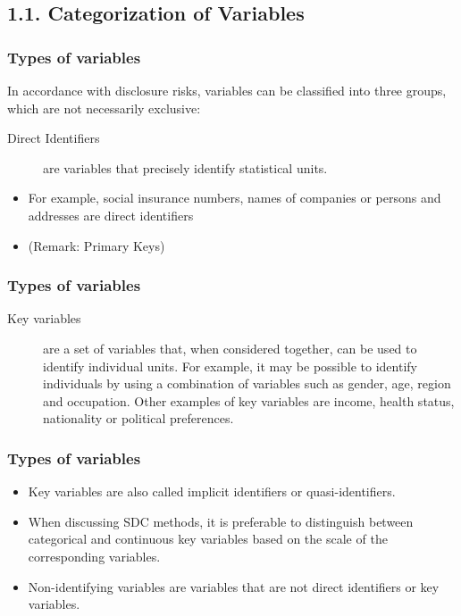 \documentclass{beamer}
\begin{document}
\subsection*{1.1. Categorization of Variables}
\begin{frame}
\frametitle{Types of variables}

In accordance with disclosure risks, variables can be classiﬁed into three groups,
which are not necessarily exclusive:

\bigskip
\begin{description}
	\item[Direct Identifiers] are variables that precisely identify statistical units. 
\end{description}

\begin{itemize}
	\item For example, social insurance numbers, names of companies or persons and addresses
	are direct identiﬁers 
	\item (Remark: Primary Keys)
\end{itemize}
\end{frame}
\begin{frame}
\frametitle{Types of variables}
\begin{description}
	\item[Key variables] are a set of variables that, when considered together, can be used
	to identify individual units. For example, it may be possible to identify
	individuals by using a combination of variables such as gender, age, region
	and occupation. Other examples of key variables are income, health status,
	nationality or political preferences. 
\end{description}
\end{frame}
\begin{frame}
	\frametitle{Types of variables}
\begin{itemize}
	\item Key variables are also called implicit
	identiﬁers or quasi-identifiers. \item When discussing SDC methods, it is preferable
	to distinguish between categorical and continuous key variables based on the
	scale of the corresponding variables.
	\item Non-identifying variables are variables that are not direct identiﬁers or key variables.
\end{itemize}
\end{frame}
\end{document}
